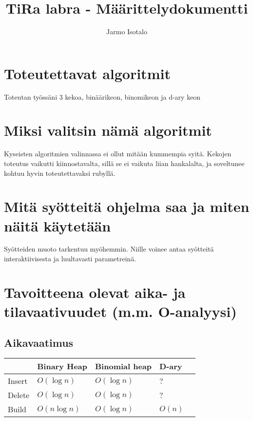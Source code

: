 \documentclass[a4paper,12pt]{article}
\begin{document}
\title{TiRa labra - Määrittelydokumentti} 
\author{Jarmo Isotalo}
\maketitle

\section{Toteutettavat algoritmit}

Toteutan työssäni 3 kekoa, binäärikeon, binomikeon ja d-ary keon

\section{Miksi valitsin nämä algoritmit}

Kyseisten algoritmien valinnassa ei ollut mitään kummempia syitä. Kekojen toteutus vaikutti
kiinnostavalta, sillä se ei vaikuta liian hankalalta, ja soveltunee kohtuu hyvin toteutettavaksi rubyllä.

\section{Mitä syötteitä ohjelma saa ja miten näitä käytetään}
Syötteiden muoto tarkentuu myöhemmin. 
Niille voinee antaa syötteitä interaktiivisesta ja luultavasti parametreinä.

\section{Tavoitteena olevat aika- ja tilavaativuudet (m.m. O-analyysi)}

\subsection{Aikavaatimus}
\begin{tabular}{|l|l|l|l|l|}
\hline
&Binary Heap & Binomial heap & D-ary \\\hline
Insert & $O (\log n)$ & $O (\log n)$ & ?\\\hline
Delete  & $O (\log n)$ & $O (\log n)$ & ?\\\hline
Build & $O (n \log n)$ & $O (\log n)$ & $O (n)$\\\hline
\end{tabular}
\end{document}
